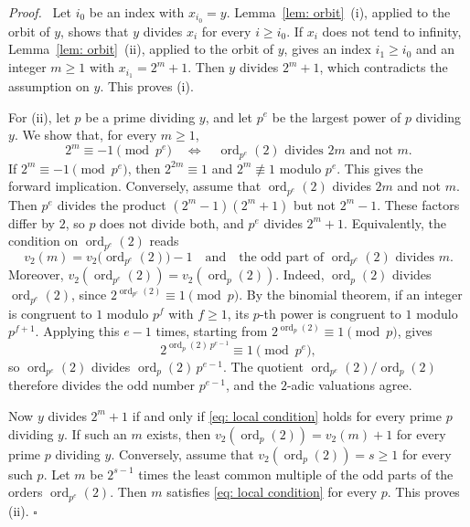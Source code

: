 \documentclass{article}
\newenvironment{proof}[1][Proof]{\par\medskip\noindent\textit{#1.}\ }{\hfill$\square$\par\medskip}
\newcommand{\Ge}{\geqslant}
\newcommand{\ord}{\operatorname{ord}}
\begin{document}
\begin{proof}
    Let $i_0$ be an index with $x_{i_0} = y$. Lemma~\ref{lem: orbit}~(i), applied to the orbit of $y$, shows that $y$ divides $x_i$ for every $i \Ge i_0$. If $x_i$ does not tend to infinity, Lemma~\ref{lem: orbit}~(ii), applied to the orbit of $y$, gives an index $i_1 \Ge i_0$ and an integer $m \Ge 1$ with $x_{i_1} = 2^m + 1$. Then $y$ divides $2^m + 1$, which contradicts the assumption on $y$. This proves (i).

    For (ii), let $p$ be a prime dividing $y$, and let $p^e$ be the largest power of $p$ dividing $y$. We show that, for every $m \Ge 1$,
    \begin{equation*}
        2^m \equiv -1 \pmod{p^e} \quad \Longleftrightarrow \quad \ord_{p^e}(2) \text{ divides } 2m \text{ and not } m .
    \end{equation*}
    If $2^m \equiv -1 \pmod{p^e}$, then $2^{2m} \equiv 1$ and $2^m \not\equiv 1$ modulo $p^e$. This gives the forward implication. Conversely, assume that $\ord_{p^e}(2)$ divides $2m$ and not $m$. Then $p^e$ divides the product $(2^m - 1)(2^m + 1)$ but not $2^m - 1$. These factors differ by $2$, so $p$ does not divide both, and $p^e$ divides $2^m + 1$. Equivalently, the condition on $\ord_{p^e}(2)$ reads
    \begin{equation}
        v_2(m) = v_2 \bigl( \ord_{p^e}(2) \bigr) - 1 \quad \text{and} \quad \text{the odd part of } \ord_{p^e}(2) \text{ divides } m .
        \label{eq: local condition}
    \end{equation}
    Moreover, $v_2(\ord_{p^e}(2)) = v_2(\ord_p(2))$. Indeed, $\ord_p(2)$ divides $\ord_{p^e}(2)$, since $2^{\ord_{p^e}(2)} \equiv 1 \pmod p$. By the binomial theorem, if an integer is congruent to $1$ modulo $p^f$ with $f \Ge 1$, its $p$-th power is congruent to $1$ modulo $p^{f+1}$. Applying this $e - 1$ times, starting from $2^{\ord_p(2)} \equiv 1 \pmod p$, gives
    \begin{equation*}
        2^{\ord_p(2) \, p^{e-1}} \equiv 1 \pmod{p^e} ,
    \end{equation*}
    so $\ord_{p^e}(2)$ divides $\ord_p(2) \, p^{e-1}$. The quotient $\ord_{p^e}(2) / \ord_p(2)$ therefore divides the odd number $p^{e-1}$, and the $2$-adic valuations agree.

    Now $y$ divides $2^m + 1$ if and only if \eqref{eq: local condition} holds for every prime $p$ dividing $y$. If such an $m$ exists, then $v_2(\ord_p(2)) = v_2(m) + 1$ for every prime $p$ dividing $y$. Conversely, assume that $v_2(\ord_p(2)) = s \Ge 1$ for every such $p$. Let $m$ be $2^{s-1}$ times the least common multiple of the odd parts of the orders $\ord_{p^e}(2)$. Then $m$ satisfies \eqref{eq: local condition} for every $p$. This proves (ii).
\end{proof}
\end{document}
